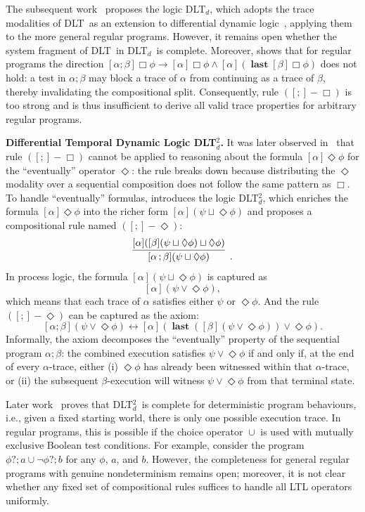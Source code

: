 \documentclass[manuscript,screen]{acmart}
\DeclareMathOperator{\seq}{;}
\DeclareMathOperator{\cho}{\cup}
\DeclareMathOperator{\last}{\mathbf{last}}
\newcommand{\DLT}[0]{\mbox{DLT}}
\newcommand{\DLb}[0]{\mbox{DLT$_{\text{b}}$}}
\newcommand{\diffTL}[0]{\mbox{DLT$_d$}}
\newcommand{\diffTLii}[0]{\mbox{DLT$^2_d$}}
\begin{document}
The subsequent work~\cite{PlatzersTDL} proposes the logic \diffTL, which adopts the trace modalities of \DLT\ as an extension to differential dynamic logic~\cite{Platzer07b}, applying them to the more general regular programs.  However, it remains open whether the system fragment of \DLT\ in \diffTL\ is complete.  Moreover, \cite{Zhang24} shows that for regular programs the direction $[\alpha\seq\beta]\Box\phi\rightarrow [\alpha]\Box\phi\wedge [\alpha](\last [\beta]\Box\phi)$ does not hold: a test in $\alpha\seq\beta$ may block a trace of $\alpha$ from continuing as a trace of $\beta$, thereby invalidating the compositional split.  Consequently, rule $([\seq]-\Box)$ is too strong and is thus insufficient to derive all valid trace properties for arbitrary regular programs. 

\textbf{Differential Temporal Dynamic Logic \diffTLii.} It was later observed in~\cite{PlatzersTDL} that rule $([\seq]-\Box)$ cannot be applied to reasoning about the formula $[\alpha]\Diamond\phi$ for the ``eventually'' operator $\Diamond$: the rule breaks down because distributing the $\Diamond$ modality over a sequential composition does not follow the same pattern as $\Box$. 
To handle ``eventually'' formulas, \cite{DTL2} introduces the logic \diffTLii, which enriches the formula $[\alpha]\Diamond\phi$ into the richer form $[\alpha](\psi\sqcup \Diamond\phi)$ and proposes a compositional rule named $([\seq]-\Diamond)$: 
$$
\infer[]
{[\alpha\seq\beta](\psi\sqcup \Diamond\phi)}
{[\alpha]([\beta](\psi\sqcup\Diamond\phi)\sqcup \Diamond\phi)}. 
$$
In process logic, the formula $[\alpha](\psi\sqcup \Diamond\phi)$ is captured as
$$
[\alpha](\psi\vee \Diamond\phi), 
$$
which means that each trace of $\alpha$ satisfies either $\psi$ or $\Diamond\phi$. 
And the rule $([\seq]-\Diamond)$ can be captured as the axiom:
$$
[\alpha\seq\beta](\psi\vee \Diamond\phi) \leftrightarrow [\alpha](\last ([\beta](\psi\vee \Diamond\phi))\vee \Diamond\phi). 
$$
Informally, the axiom decomposes the ``eventually'' property of the sequential program $\alpha\seq\beta$: the combined execution satisfies $\psi\vee\Diamond\phi$ if and only if, at the end of every $\alpha$-trace, either (i) $\Diamond\phi$ has already been witnessed within that $\alpha$-trace, or (ii) the subsequent $\beta$-execution will witness $\psi\vee\Diamond\phi$ from that terminal state. 

Later work~\cite{Ahmad21} proves that \diffTLii\ is complete for deterministic program behaviours, i.e., given a fixed starting world, there is only one possible execution trace. 
In regular programs, this is possible if the choice operator $\cho$ is used with mutually exclusive Boolean test conditions. For example, consider the program $\phi?\seq a\cho \neg\phi?\seq b$ for any $\phi$, $a$, and $b$. 
However, the completeness for general regular programs with genuine nondeterminism remains open; moreover, it is not clear whether any fixed set of compositional rules suffices to handle all LTL operators uniformly.
\end{document}

